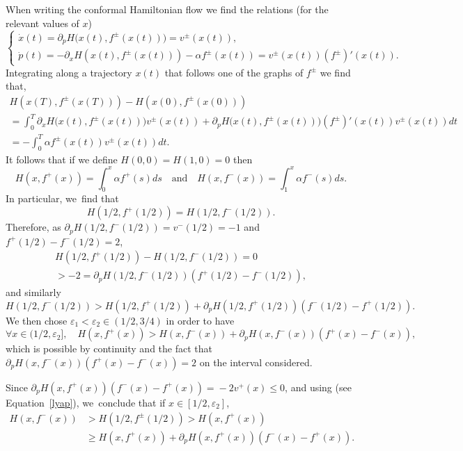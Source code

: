 \documentclass[JEP,XML,SOM,Unicode,NoFloatCountersInSection,published]{cedram}
\theoremstyle{definition}
\begin{document}
\begin{appendix}
When writing the conformal Hamiltonian flow we find the relations (for the relevant values of $x$)
\[
\begin{cases}
\dot x(t) = \partial_p H\bigl(x(t), f^\pm(x(t))\bigr) = v^\pm (x(t)), \\
\dot p(t) = -\partial_x H(x(t), f^\pm(x(t)))-\alpha f^{\pm}(x(t)) = v^\pm(x(t))(f^{\pm})'(x(t)).
\end{cases}
\]
Integrating along a trajectory $x(t)$ that follows one of the graphs of $f^\pm$ we find that,\vspace*{-5pt}
\begin{multline*}
H(x(T), f^\pm(x(T)))-H(x(0), f^\pm(x(0)))\\[-2pt]
=\int_0^T \partial_x H\bigl(x(t), f^\pm(x(t))\bigr) v^\pm (x(t)) + \partial_p H\bigl(x(t), f^\pm(x(t))\bigr)(f^{\pm})'(x(t)) v^\pm (x(t)) dt \\[-3pt]
= -\int_0^T \alpha f^\pm(x(t))v^\pm (x(t)) dt .
\end{multline*}
It follows that if we define $H(0,0) = H(1,0) = 0$ then\vspace*{-3pt}
\begin{equation}\label{lyap}
H(x,f^+(x))= \int_0^x \alpha f^+(s) ds \quad\text{and}\quad H(x,f^-(x))= \int_1^x \alpha f^-(s) ds.
\end{equation}
In particular, we~find that\vspace*{-5pt}
\[
H(1/2, f^+(1/2)) =H(1/2, f^-(1/2)).
\]
Therefore, as $\partial_p H(1/2, f^-(1/2))= v^-(1/2)=-1$ and $f^+(1/2)-f^-(1/2)=2$,\vspace*{-5pt}
\begin{multline*}
H(1/2, f^+(1/2))-H(1/2, f^-(1/2))=0\\
>-2= \partial_p H(1/2, f^-(1/2))(f^+(1/2)-f^-(1/2)),
\end{multline*}
and similarly
\[
H(1/2, f^-(1/2))>H(1/2, f^+(1/2)) + \partial_p H(1/2, f^+(1/2))(f^-(1/2)-f^+(1/2)).
\]
We then chose $\varepsilon_1<\varepsilon_2\in (1/2,3/4)$ in order to have\vspace*{-3pt}
\begin{equation}\label{cond1}
\forall x\in (1/2,\varepsilon_2], \quad H(x, f^+(x))>H(x, f^-(x)) + \partial_p H(x, f^-(x))(f^+(x)-f^-(x)),
\end{equation}
which is possible by continuity and the fact that $ \partial_p H(x, f^-(x))(f^+(x)-f^-(x))= 2$ on the interval considered.

Since $\partial_p H(x, f^+(x))(f^-(x)\!-\!f^+(x)) \!=\! -2v^+(x)\leq 0$, and using (see Equation~\eqref{lyap}), we~conclude that if $x\in [1/2,\varepsilon_2]$,\vspace*{-3pt}
\begin{equation}\label{cond2}
\begin{aligned}
H(x,f^-(x))&> H(1/2,f^\pm(1/2))>
H(x,f^+(x))\\ 
&\geq H(x,f^+(x)) +\partial_p H(x, f^+(x))(f^-(x)-f^+(x)).
\end{aligned}
\end{equation}


\end{appendix}
\end{document}
